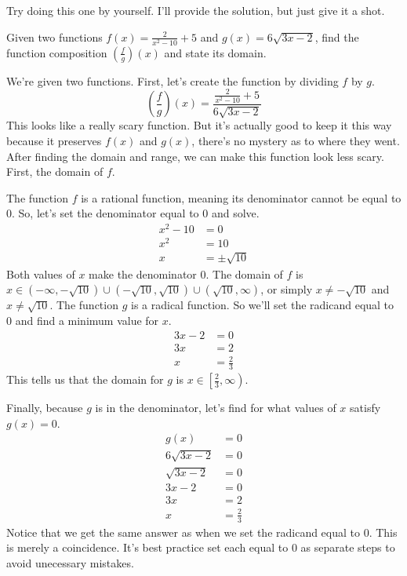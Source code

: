 Try doing this one by yourself. I'll provide the solution, but just give it a shot.
\begin{problem}
    Given two functions $f(x) = \frac{2}{x^2 - 10} + 5$ and $g(x) = 6\sqrt{3x - 2}$, find the function composition $\left(\frac{f}{g} \right)(x)$ and state its domain.
\end{problem}
\begin{solution}
    We're given two functions. First, let's create the function by dividing $f$ by $g$.
    \[
        \left(\frac{f}{g} \right)(x) = 
        \frac{\frac{2}{x^2 - 10} + 5}{6\sqrt{3x - 2}}
    \] 
    This looks like a really scary function. But it's actually good to keep it this way because it preserves $f(x)$ and $g(x)$, there's no mystery as to where they went. After finding the domain and range, we can make this function look less scary. First, the domain of $f$.

    The function $f$ is a rational function, meaning its denominator cannot be equal to $0$. So, let's set the denominator equal to $0$ and solve.
    \begin{align*}
        x^2 - 10 &= 0 \\
        x^2 &= 10 \\
        x &= \pm \sqrt{10}
    \end{align*}
    Both values of $x$ make the denominator $0$. The domain of $f$ is\\
    $x \in (-\infty, -\sqrt{10}) \cup (-\sqrt{10}, \sqrt{10}) \cup (\sqrt{10}, \infty)$, or simply $x \neq -\sqrt{10}$ and $x \neq \sqrt{10}$.
    \clearpage
    The function $g$ is a radical function. So we'll set the radicand equal to $0$ and find a minimum value for $x$.
    \begin{align*}
        3x - 2 &= 0 \\
        3x &= 2 \\
        x &= \frac{2}{3}
    \end{align*}
    This tells us that the domain for $g$ is $x \in \left[\frac{2}{3}, \infty \right)$.
    
    Finally, because $g$ is in the denominator, let's find for what values of $x$ satisfy $g(x) = 0$.
    \begin{align*}
        g(x) &= 0 \\
        6\sqrt{3x - 2} &= 0 \\
        \sqrt{3x - 2} &= 0 \\
        3x - 2 &= 0 \\
        3x &= 2 \\
        x &= \frac{2}{3}
    \end{align*}
    Notice that we get the same answer as when we set the radicand equal to $0$. This is merely a coincidence. It's best practice set each equal to $0$ as separate steps to avoid unecessary mistakes.


\end{solution}
